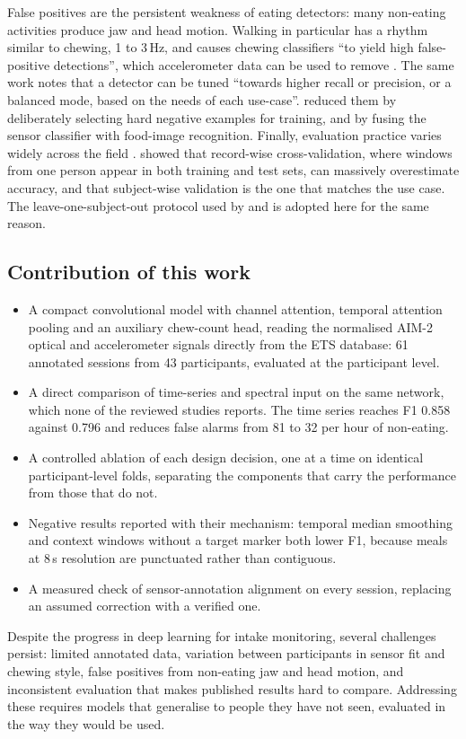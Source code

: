 False positives are the persistent weakness of eating detectors: many
non-eating activities produce jaw and head motion. Walking in particular has
a rhythm similar to chewing, 1 to 3\,Hz, and causes chewing classifiers ``to
yield high false-positive detections'', which accelerometer data can be used
to remove \citep{diou2022intake}. The same work notes that a detector can be
tuned ``towards higher recall or precision, or a balanced mode, based on the
needs of each use-case''. \citet{stankoski2021smartwatch}
reduced them by deliberately selecting hard negative examples for training,
and \citet{ghosh2024integrated} by fusing the sensor classifier with food-image
recognition. Finally, evaluation practice varies widely across the field
\citep{bell2020scoping}. \citet{saeb2017need} showed that record-wise
cross-validation, where windows from one person appear in both training and
test sets, can massively overestimate accuracy, and that subject-wise
validation is the one that matches the use case. The leave-one-subject-out
protocol used by \citet{doulah2021aim2} and \citet{diou2022intake} is adopted
here for the same reason.

\subsection{Contribution of this work}

\begin{itemize}
  \item A compact convolutional model with channel attention, temporal
        attention pooling and an auxiliary chew-count head, reading the
        normalised AIM-2 optical and accelerometer signals directly from the
        ETS database: 61 annotated sessions from 43 participants, evaluated
        at the participant level.
  \item A direct comparison of time-series and spectral input on the same
        network, which none of the reviewed studies reports. The time
        series reaches F1 0.858 against 0.796 and reduces false alarms from
        81 to 32 per hour of non-eating.
  \item A controlled ablation of each design decision, one at a time on
        identical participant-level folds, separating the components that
        carry the performance from those that do not.
  \item Negative results reported with their mechanism: temporal median
        smoothing and context windows without a target marker both lower
        F1, because meals at 8\,s resolution are punctuated rather than
        contiguous.
  \item A measured check of sensor-annotation alignment on every session,
        replacing an assumed correction with a verified one.
\end{itemize}

Despite the progress in deep learning for intake monitoring, several
challenges persist: limited annotated data, variation between participants
in sensor fit and chewing style, false positives from non-eating jaw and head
motion, and inconsistent evaluation that makes published results hard to
compare. Addressing these requires models that generalise to people they
have not seen, evaluated in the way they would be used.
